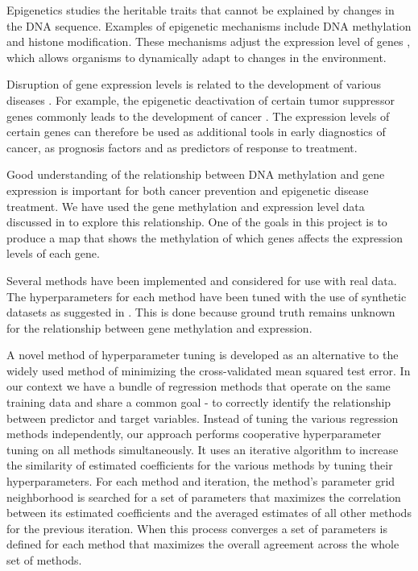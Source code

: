 Epigenetics \cite{holliday2006epigenetics} studies the heritable traits that cannot be explained by changes in the DNA sequence. Examples of epigenetic mechanisms include DNA methylation and histone modification. These mechanisms adjust the expression level of genes \cite{jaenisch2003epigenetic}, which allows organisms to dynamically adapt to changes in the environment.

Disruption of gene expression levels is related to the development of various diseases \cite{egger2004epigenetics}. For example, the epigenetic deactivation of certain tumor suppressor genes commonly leads to the development of cancer \cite{esteller2008epigenetics}. The expression levels of certain genes can therefore be used as additional tools in early diagnostics of cancer, as prognosis factors and as predictors of response to treatment.

Good understanding of the relationship between DNA methylation and gene expression is important for both cancer prevention and epigenetic disease treatment. We have used the gene methylation and expression level data discussed in \cite{cancer2012comprehensive} to explore this relationship. One of the goals in this project is to produce a map that shows the methylation of which genes affects the expression levels of each gene.

Several methods \cite{tibshirani1996regression,zou2005regularization,li2008network,li2010variable,pan2010incorporating,luo2012two,kim2013network} have been implemented and considered for use with real data. The hyperparameters for each method have been tuned with the use of synthetic datasets as suggested in \cite{li2008network}. This is done because ground truth remains unknown for the relationship between gene methylation and expression.

A novel method of hyperparameter tuning is developed as an alternative to the widely used method of minimizing the cross-validated mean squared test error. In our context we have a bundle of regression methods that operate on the same training data and share a common goal - to correctly identify the relationship between predictor and target variables. Instead of tuning the various regression methods independently, our approach performs cooperative hyperparameter tuning on all methods simultaneously. It uses an iterative algorithm to increase the similarity of estimated coefficients for the various methods by tuning their hyperparameters. For each method and iteration, the method's parameter grid neighborhood is searched for a set of parameters that maximizes the correlation between its estimated coefficients and the averaged estimates of all other methods for the previous iteration. When this process converges a set of parameters is defined for each method that maximizes the overall agreement across the whole set of methods.

